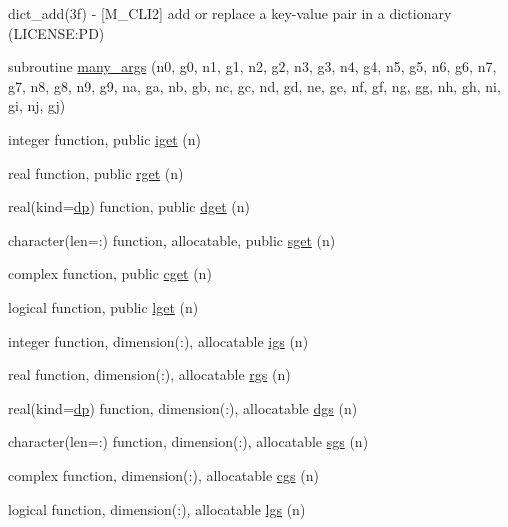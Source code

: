 \begin{DoxyCompactItemize}
\begin{DoxyCompactList}
dict\+\_\+add(3f) -\/ \mbox{[}M\+\_\+\+C\+L\+I2\mbox{]} add or replace a key-\/value pair in a dictionary (L\+I\+C\+E\+N\+SE\+:PD) \end{DoxyCompactList}\item 
subroutine \mbox{\hyperlink{namespacem__cli2_a2d1a2b245e9a5e5897e5bff0afc2a217}{many\+\_\+args}} (n0, g0, n1, g1, n2, g2, n3, g3, n4, g4, n5, g5, n6, g6, n7, g7, n8, g8, n9, g9, na, ga, nb, gb, nc, gc, nd, gd, ne, ge, nf, gf, ng, gg, nh, gh, ni, gi, nj, gj)
\item 
integer function, public \mbox{\hyperlink{namespacem__cli2_a1b41630a5b78ed0fcb6b6df49ac7738d}{iget}} (n)
\item 
real function, public \mbox{\hyperlink{namespacem__cli2_ade3a531cb1b2a60855ebe38031f7ed7a}{rget}} (n)
\item 
real(kind=\mbox{\hyperlink{namespacem__cli2_acf83f1963cf6a56ad0221cfcf5402440}{dp}}) function, public \mbox{\hyperlink{namespacem__cli2_abb63058af19a47e19a78567c4a320c16}{dget}} (n)
\item 
character(len=\+:) function, allocatable, public \mbox{\hyperlink{namespacem__cli2_afb7e36674c50a0839bd4eae8301efefc}{sget}} (n)
\item 
complex function, public \mbox{\hyperlink{namespacem__cli2_a753fbd0c09fbfd712c7f4add246818cf}{cget}} (n)
\item 
logical function, public \mbox{\hyperlink{namespacem__cli2_a12c60a847f6ce11bd057e4fcc038a655}{lget}} (n)
\item 
integer function, dimension(\+:), allocatable \mbox{\hyperlink{namespacem__cli2_a39e18c9b881ea554d6d0adee0f5a5313}{igs}} (n)
\item 
real function, dimension(\+:), allocatable \mbox{\hyperlink{namespacem__cli2_ab526bbc0ccf60b19e298e49bf95e0595}{rgs}} (n)
\item 
real(kind=\mbox{\hyperlink{namespacem__cli2_acf83f1963cf6a56ad0221cfcf5402440}{dp}}) function, dimension(\+:), allocatable \mbox{\hyperlink{namespacem__cli2_a84bc83f5e8ec87f4d691e40df7569c83}{dgs}} (n)
\item 
character(len=\+:) function, dimension(\+:), allocatable \mbox{\hyperlink{namespacem__cli2_aa4eb8a68238351ba1893f9ce555f5c49}{sgs}} (n)
\item 
complex function, dimension(\+:), allocatable \mbox{\hyperlink{namespacem__cli2_a05456ce2d696e1632be5efe8e7c2afe3}{cgs}} (n)
\item 
logical function, dimension(\+:), allocatable \mbox{\hyperlink{namespacem__cli2_a4cda9acefdf56b45483ea41b73494c8d}{lgs}} (n)

\end{DoxyCompactItemize}
